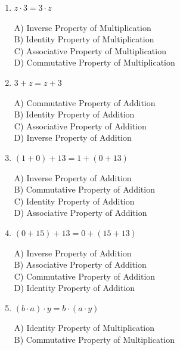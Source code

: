 \documentclass[11pt]{article}
\begin{document}
\begin{enumerate}
  \item $z \cdot 3 = 3 \cdot z$
\\[2pt]
\begin{minipage}{\linewidth}
A) Inverse Property of Multiplication \\
B) Identity Property of Multiplication \\
C) Associative Property of Multiplication \\
D) Commutative Property of Multiplication
\end{minipage}
  \vspace{0.3cm}
  \item $3 + z = z + 3$
\\[2pt]
\begin{minipage}{\linewidth}
A) Commutative Property of Addition \\
B) Identity Property of Addition \\
C) Associative Property of Addition \\
D) Inverse Property of Addition
\end{minipage}
  \vspace{0.3cm}
  \item $(1 + 0) + 13 = 1 + (0 + 13)$
\\[2pt]
\begin{minipage}{\linewidth}
A) Inverse Property of Addition \\
B) Commutative Property of Addition \\
C) Identity Property of Addition \\
D) Associative Property of Addition
\end{minipage}
  \vspace{0.3cm}
  \item $(0 + 15) + 13 = 0 + (15 + 13)$
\\[2pt]
\begin{minipage}{\linewidth}
A) Inverse Property of Addition \\
B) Associative Property of Addition \\
C) Commutative Property of Addition \\
D) Identity Property of Addition
\end{minipage}
  \vspace{0.3cm}
  \item $(b \cdot a) \cdot y = b \cdot (a \cdot y)$
\\[2pt]
\begin{minipage}{\linewidth}
A) Identity Property of Multiplication \\
B) Commutative Property of Multiplication \\

\end{minipage}
\end{enumerate}
\end{document}
